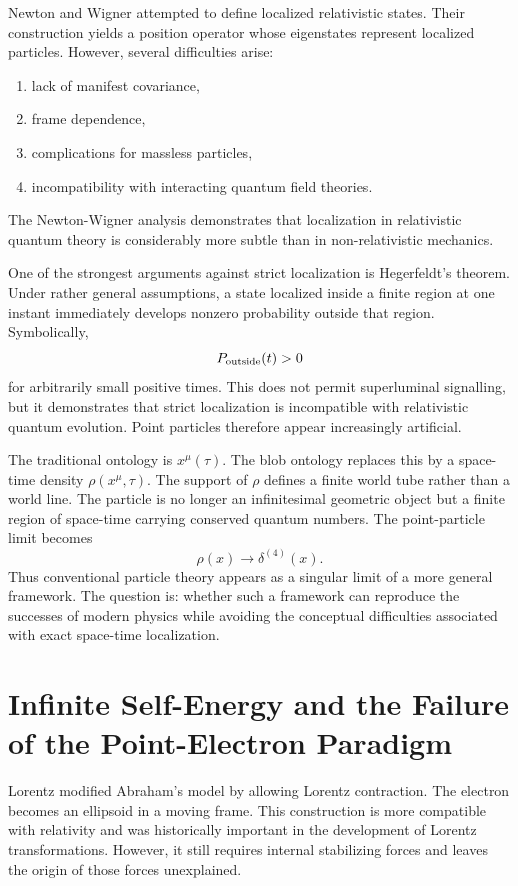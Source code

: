 Newton and Wigner attempted to define localized relativistic states.
Their construction yields a position operator whose eigenstates represent
localized particles.
However, several difficulties arise:
\begin{enumerate}
\item lack of manifest covariance,
\item frame dependence,
\item complications for massless particles,
\item incompatibility with interacting quantum field theories.
\end{enumerate}
The Newton-Wigner analysis demonstrates that localization in relativistic 
quantum theory is considerably more subtle than in non-relativistic mechanics.

One of the strongest arguments against strict localization 
is Hegerfeldt's theorem.
Under rather general assumptions, a state localized inside a finite region
at one instant immediately develops nonzero probability outside that region.
Symbolically,
\[P_{\rm outside}(t) > 0\]
for arbitrarily small positive times.
This does not permit superluminal signalling, but it demonstrates that strict 
localization is incompatible with relativistic quantum evolution.
Point particles therefore appear increasingly artificial.

The traditional ontology is $x^\mu(\tau).$
The blob ontology replaces this by a space-time density
$\rho(x^\mu,\tau)$.
The support of $\rho$ defines a finite world tube rather than a world line.
The particle is no longer an infinitesimal geometric object but a finite 
region of space-time carrying conserved quantum numbers.
The point-particle limit becomes
\[\rho(x) \rightarrow \delta^{(4)}(x).\]
Thus conventional particle theory appears as a singular limit of a more 
general framework. The question is: whether such a framework can 
reproduce the successes of modern physics while avoiding the conceptual 
difficulties associated with exact space-time localization.

\section{Infinite Self-Energy and the Failure of the Point-Electron Paradigm}
Lorentz modified Abraham's model by allowing Lorentz contraction.
The electron becomes an ellipsoid in a moving frame.
This construction is more compatible with relativity and was historically 
important in the development of Lorentz transformations.
However, it still requires internal stabilizing forces and leaves the origin
of those forces unexplained.

